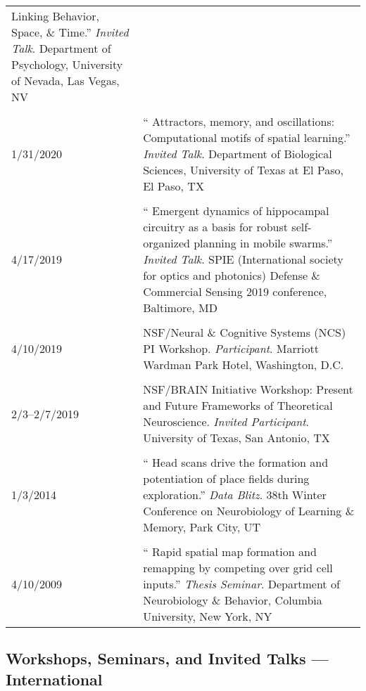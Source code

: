 \documentclass[10pt]{article}
\newcommand{\unpubtitle}[1]{{\color{hopkinsblue} #1}}
\begin{document}
\begin{longtable}{@{\hspace{0.2in}}l>{\raggedright\arraybackslash}p{}}
{  Linking Behavior, Space, \& Time}.'' \emph{Invited Talk}. Department of
  Psychology, University of Nevada, Las Vegas, NV\\
  \tabularnewline
  1/31/2020 \hspace{0.3in} & ``\unpubtitle{Attractors, memory, and oscillations:
  Computational motifs of spatial learning}.'' \emph{Invited Talk}.
  Department of Biological Sciences, University of Texas at El Paso, El Paso, TX\\
  \tabularnewline
  4/17/2019 \hspace{0.3in} & ``\unpubtitle{Emergent dynamics of hippocampal
  circuitry as a basis for robust self-organized planning in mobile swarms}.''
  \emph{Invited Talk}. SPIE (International society for optics and photonics)
  Defense \& Commercial Sensing 2019 conference, Baltimore, MD\\
  \tabularnewline
  4/10/2019 & NSF/Neural \& Cognitive Systems (NCS) PI
  Workshop. \emph{Participant}. Marriott Wardman Park Hotel, Washington, D.C.\\
  \tabularnewline
  2/3--2/7/2019 & NSF/BRAIN Initiative Workshop: Present and Future Frameworks
  of Theoretical Neuroscience. \emph{Invited Participant}. University of Texas,
  San Antonio, TX\\
  \tabularnewline
  1/3/2014 & ``\unpubtitle{Head scans drive the formation and potentiation
  of place fields during exploration}.'' \emph{Data Blitz}. 38th Winter
  Conference on Neurobiology of Learning \& Memory, Park City, UT\\
  \tabularnewline
  4/10/2009 & ``\unpubtitle{Rapid spatial map formation and remapping by
  competing over grid cell inputs}.'' \emph{Thesis Seminar}. Department of
  Neurobiology \& Behavior, Columbia University, New York, NY\\
\end{longtable}

\subsection*{Workshops, Seminars, and Invited Talks --- International}
\label{sec:talksintl}
\end{document}
